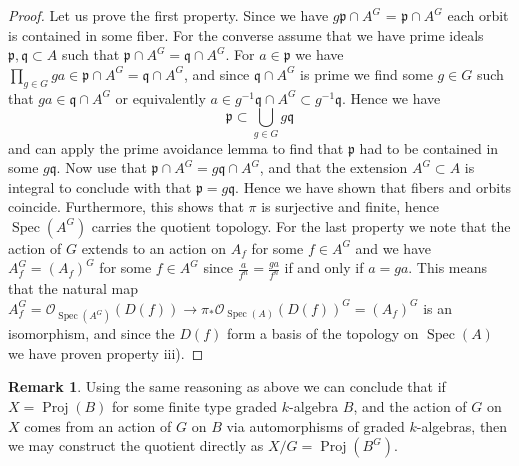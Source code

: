 \documentclass[11pt, a4paper, english, twoside]{article}
\theoremstyle{plain}
\theoremstyle{definition}
\newtheorem{remark}[theorem]{Remark}
\DeclareMathOperator{\Spec}{Spec}
\DeclareMathOperator{\Proj}{Proj}
\begin{document}
\begin{proof}
    Let us prove the first property.
    Since we have $g\mathfrak{p} \cap A^G$ = $\mathfrak{p} \cap A^G$ each orbit is contained in some fiber. For the converse assume that we have
    prime ideals $\mathfrak{p},\mathfrak{q} \subset A$ such that $\mathfrak{p} \cap A^G = \mathfrak{q} \cap A^G$.
    For $a \in \mathfrak{p}$ we have $\prod_{g \in G} ga \in \mathfrak{p} \cap A^G = \mathfrak{q} \cap A^G$, and since $\mathfrak{q} \cap A^G$
    is prime we find some $g \in G$ such that $ga \in \mathfrak{q} \cap A^G$ or equivalently 
    $a \in g^{-1}\mathfrak{q} \cap A^G \subset g^{-1}\mathfrak{q}$. Hence 
    we have 
    \[
        \mathfrak{p} \subset \bigcup_{g \in G} g\mathfrak{q}
    \]
    and can apply the prime avoidance lemma to find that $\mathfrak{p}$ had to be
    contained in some $g\mathfrak{q}$. 
    Now use that $\mathfrak{p} \cap A^G = g\mathfrak{q} \cap A^G$, and that the extension $A^G \subset A$ is integral to conclude with
    \cite[Cor.\ 5.8]{atmc} that $\mathfrak{p} = g\mathfrak{q}$.
    Hence we have shown that fibers and orbits coincide. Furthermore, this shows that $\pi$ is
    surjective and finite, hence $\Spec(A^G)$ carries the quotient topology.
    For the last property we note that the action of $G$ extends to an action on $A_f$ for some $f \in A^G$ and we have 
    $A^G_f = (A_f)^G$ for some $f \in A^G$ since $\frac{a}{f^n} = \frac{ga}{f^n}$ if and only if $a = ga$. This means that the natural
    map $A^G_f = \mathcal{O}_{\Spec(A^G)}(D(f)) \to \pi_*\mathcal{O}_{\Spec(A)}(D(f))^G = (A_f)^G$ is an isomorphism, and since the $D(f)$ form
    a basis of the topology on $\Spec(A)$ we have proven property iii).
\end{proof}
\begin{remark}
    Using the same reasoning as above we can conclude that if $X = \Proj(B)$ for some finite type graded $k$-algebra $B$, 
    and the action of $G$ on $X$ comes from
    an action of $G$ on $B$ via automorphisms of graded $k$-algebras, then we may construct the quotient directly as $X/G = \Proj(B^G)$.
\end{remark}
\end{document}
